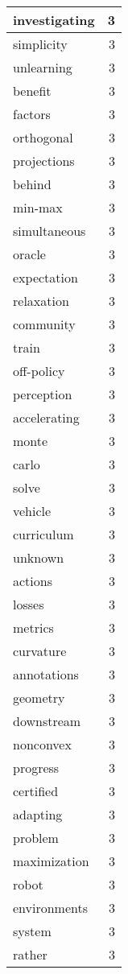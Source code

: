 \begin{table}[h]
\begin{tabular}{|l|r|}
\hline
investigating & 3 \\
\hline
simplicity & 3 \\
\hline
unlearning & 3 \\
\hline
benefit & 3 \\
\hline
factors & 3 \\
\hline
orthogonal & 3 \\
\hline
projections & 3 \\
\hline
behind & 3 \\
\hline
min-max & 3 \\
\hline
simultaneous & 3 \\
\hline
oracle & 3 \\
\hline
expectation & 3 \\
\hline
relaxation & 3 \\
\hline
community & 3 \\
\hline
train & 3 \\
\hline
off-policy & 3 \\
\hline
perception & 3 \\
\hline
accelerating & 3 \\
\hline
monte & 3 \\
\hline
carlo & 3 \\
\hline
solve & 3 \\
\hline
vehicle & 3 \\
\hline
curriculum & 3 \\
\hline
unknown & 3 \\
\hline
actions & 3 \\
\hline
losses & 3 \\
\hline
metrics & 3 \\
\hline
curvature & 3 \\
\hline
annotations & 3 \\
\hline
geometry & 3 \\
\hline
downstream & 3 \\
\hline
nonconvex & 3 \\
\hline
progress & 3 \\
\hline
certified & 3 \\
\hline
adapting & 3 \\
\hline
problem & 3 \\
\hline
maximization & 3 \\
\hline
robot & 3 \\
\hline
environments & 3 \\
\hline
system & 3 \\
\hline
rather & 3 \\

\end{tabular}
\end{table}
